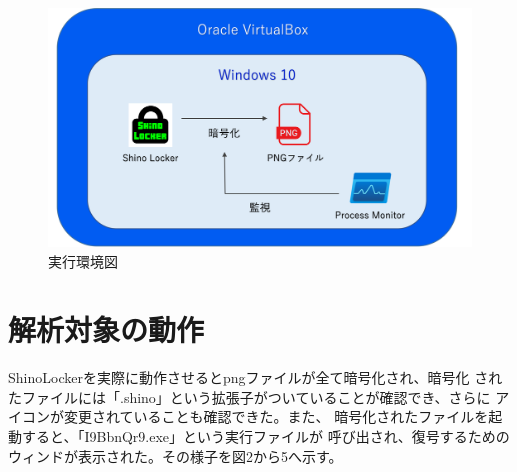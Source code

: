 \documentclass[dvipdfmx,autodetect-engine]{jsarticle}
\begin{document}
  \begin{figure}[H]
    \centering
    \includegraphics[scale=0.6]{pic0.png}
    \caption{実行環境図}
  \end{figure}

\section{解析対象の動作}

ShinoLockerを実際に動作させるとpngファイルが全て暗号化され、暗号化
されたファイルには「.shino」という拡張子がついていることが確認でき、さらに
アイコンが変更されていることも確認できた。また、
暗号化されたファイルを起動すると、「I9BbnQr9.exe」という実行ファイルが
呼び出され、復号するためのウィンドが表示された。その様子を図2から5へ示す。
\end{document}
